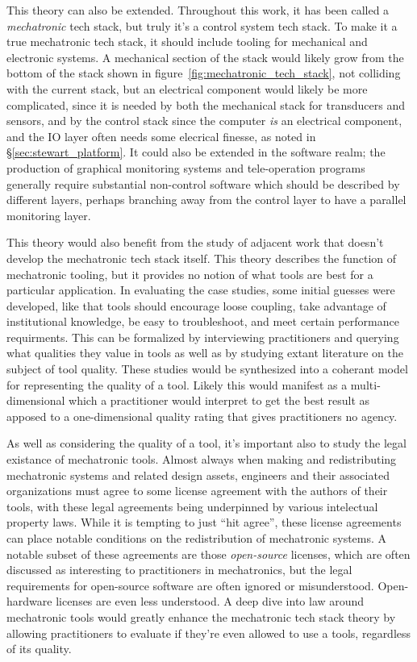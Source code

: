 \documentclass[english,12pt,a4paper,pdftex,eng,utf8]{aaltothesis}
\begin{document}
This theory can also be extended.  Throughout this work, it has been called a \textit{mechatronic} tech stack, but truly it's a control system tech stack.  To make it a true mechatronic tech stack, it should include tooling for mechanical and electronic systems.  A mechanical section of the stack would likely grow from the bottom of the stack shown in figure~\ref{fig:mechatronic_tech_stack}, not colliding with the current stack, but an electrical component would likely be more complicated, since it is needed by both the mechanical stack for transducers and sensors, and by the control stack since the computer \textit{is} an electrical component, and the IO layer often needs some elecrical finesse, as noted in §\ref{sec:stewart_platform}.  It could also be extended in the software realm; the production of graphical monitoring systems and tele-operation programs generally require substantial non-control software which should be described by different layers, perhaps branching away from the control layer to have a parallel monitoring layer.

This theory would also benefit from the study of adjacent work that doesn't develop the mechatronic tech stack itself.  This theory describes the function of mechatronic tooling, but it provides no notion of what tools are best for a particular application.  In evaluating the case studies, some initial guesses were developed, like that tools should encourage loose coupling, take advantage of institutional knowledge, be easy to troubleshoot, and meet certain performance requirments.  This can be formalized by interviewing practitioners and querying what qualities they value in tools as well as by studying extant literature on the subject of tool quality.  These studies would be synthesized into a coherant model for representing the quality of a tool.  Likely this would manifest as a multi-dimensional which a practitioner would interpret to get the best result as apposed to a one-dimensional quality rating that gives practitioners no agency.

As well as considering the quality of a tool, it's important also to study the legal existance of mechatronic tools.  Almost always when making and redistributing mechatronic systems and related design assets, engineers and their associated organizations must agree to some license agreement with the authors of their tools, with these legal agreements being underpinned by various intelectual property laws.  While it is tempting to just ``hit agree'', these license agreements can place notable conditions on the redistribution of mechatronic systems.  A notable subset of these agreements are those \textit{open-source} licenses, which are often discussed as interesting to practitioners in mechatronics, but the legal requirements for open-source software are often ignored or misunderstood.  Open-hardware licenses are even less understood.  A deep dive into law around mechatronic tools would greatly enhance the mechatronic tech stack theory by allowing practitioners to evaluate if they're even allowed to use a tools, regardless of its quality.
\end{document}
